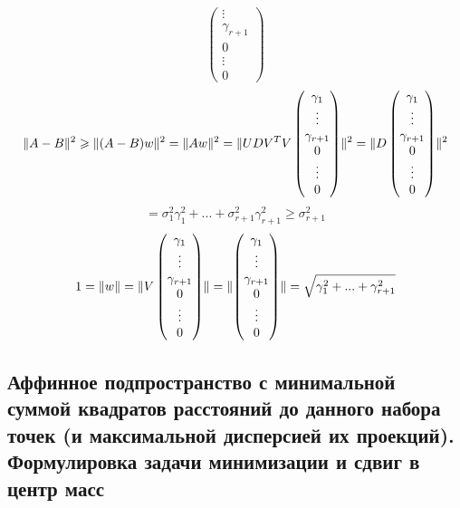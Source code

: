 \documentclass[main.tex]{subfiles}
\begin{document}
\begin{Proof}
\[\begin{pmatrix}
            \vdots\\
            \gamma_{r + 1}\\
            0\\
            \vdots\\
            0
        \end{pmatrix}\]
        \[\lVert A - B \rVert^2 \geqslant \lVert (A - B)w \rVert^2 = \lVert Aw \rVert^2 = \lVert UDV^{T}V \begin{pmatrix}
            \gamma_1\\
            \vdots\\
            \gamma_{r + 1}\\
            0\\
            \vdots\\
            0
        \end{pmatrix} \rVert^2 = \lVert D \begin{pmatrix}
            \gamma_1\\
            \vdots\\
            \gamma_{r + 1}\\
            0\\
            \vdots\\
            0
        \end{pmatrix} \rVert^2\]
        \[= \sigma_1^2 \gamma_1^2 + ... + \sigma_{r + 1}^2 \gamma_{r + 1}^2 \geq
        \sigma_{r + 1}^2 \]
        \[1 = \lVert w \rVert = \lVert V \begin{pmatrix}
            \gamma_1\\
            \vdots\\
            \gamma_{r + 1}\\
            0\\
            \vdots\\
            0
        \end{pmatrix} \rVert = \lVert \begin{pmatrix}
            \gamma_1\\
            \vdots\\
            \gamma_{r + 1}\\
            0\\
            \vdots\\
            0
        \end{pmatrix} \rVert = \sqrt{\gamma_1^2 + ... + \gamma_{r + 1}^2} \]
    \end{Proof}

    \newpage
    \subsection{Аффинное подпространство с минимальной суммой квадратов расстояний до данного набора точек (и максимальной дисперсией их проекций). Формулировка задачи минимизации и сдвиг в центр масс}
\end{document}
